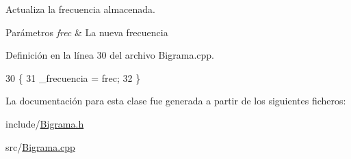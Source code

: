 Actualiza la frecuencia almacenada. 


\begin{DoxyParams}{Parámetros}
{\em frec} & La nueva frecuencia \\
\hline
\end{DoxyParams}


Definición en la línea 30 del archivo Bigrama.\+cpp.


\begin{DoxyCode}
30                                     \{
31     \_frecuencia = frec;
32 \}
\end{DoxyCode}


La documentación para esta clase fue generada a partir de los siguientes ficheros\+:\begin{DoxyCompactItemize}
\item 
include/\hyperlink{Bigrama_8h}{Bigrama.\+h}\item 
src/\hyperlink{Bigrama_8cpp}{Bigrama.\+cpp}\end{DoxyCompactItemize}
